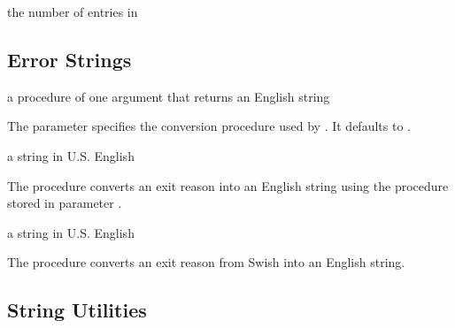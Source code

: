 \begin{procedure}
\end{procedure}
\returns{} the number of entries in 

\subsection{Error Strings}

\begin{parameter}
\end{parameter}
\hasvalue{} a procedure of one argument that returns an English string

The  parameter specifies the
conversion procedure used by . It defaults
to .

\begin{procedure}
\end{procedure}
\returns{} a string in U.S. English

The  procedure converts an exit reason into
an English string using the procedure stored in parameter
.

\begin{procedure}
\end{procedure}
\returns{} a string in U.S. English

The  procedure converts an exit
reason from Swish into an English string.

\subsection{String Utilities}

